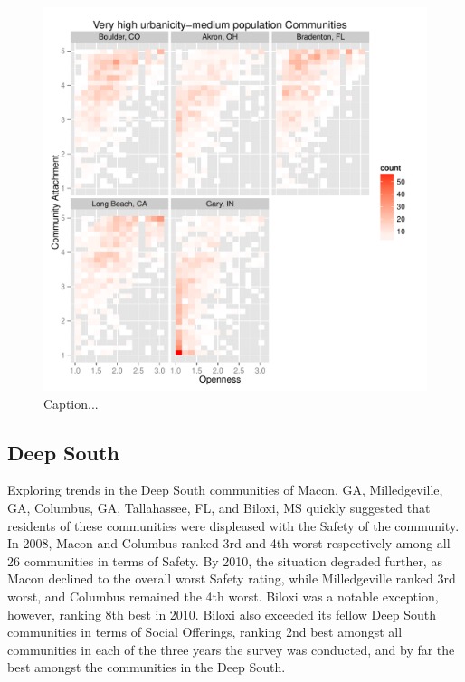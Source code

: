 \documentclass[11pt]{article}\usepackage{knitr}
\begin{document}
\begin{knitrout}
\color{fgcolor}\begin{figure}[H]


{\centering \includegraphics[width=\maxwidth]{figure/west_one} 

}

\caption[Caption]{Caption...\label{fig:west_one}}
\end{figure}


\end{knitrout}


\subsection*{Deep South}
Exploring trends in the Deep South communities of Macon, GA, Milledgeville, GA, Columbus, GA, Tallahassee, FL, and Biloxi, MS quickly suggested that residents of these communities were displeased with the Safety of the community. In 2008, Macon and Columbus ranked 3rd and 4th worst respectively among all 26 communities in terms of Safety. By 2010, the situation degraded further, as Macon declined to the overall worst Safety rating, while Milledgeville ranked 3rd worst, and Columbus remained the 4th worst. Biloxi was a notable exception, however, ranking 8th best in 2010. Biloxi also exceeded its fellow Deep South communities in terms of Social Offerings, ranking 2nd best amongst all communities in each of the three years the survey was conducted, and by far the best amongst the communities in the Deep South.
\end{document}

